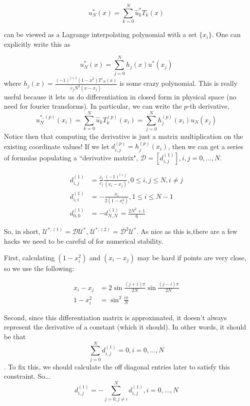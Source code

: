\documentclass[12pt]{article}
\begin{document}
\begin{equation}
    u^*_{N}(x) = \sum_{k=0}^{N} \hat{u}^*_k T_k(x)
\end{equation}

can be viewed as a Lagrange interpolating polynomial with a set $\{x_i\}$. One can explicitly write this as

\begin{equation}
    u^*_{N}(x) = \sum_{j=0}^{N} h_j(x)u^*(x_j)
\end{equation}
where $h_j(x) = \frac{(-1)^{j+1}(1-x^2)T'_N(x)}{\bar{c}_j N^2 (x - x_j)}$ is some crazy polynomial. This is really useful because it lets us do differentiation in closed form in physical space (no need for fourier transforms). In particular, we can write the $p$-th derivative,
\begin{equation}
    u^{*, (p)}_{N}(x_i) = \sum_{k=0}^N \hat{u}_k T^{(p)}_k (x_i) = \sum_{j=0}^N h^{(p)}_j(x_i)u_N(x_j)
\end{equation}
Notice then that computing the derivative is just a matrix multiplication on the existing coordinate values! If we let $d_{i,j}^{(p)} = h_j^{(p)}(x_i)$, then we can get a series of formulas populating a ``derivative matrix", $\mathcal{D} = [d^{(1)}_{i,j}], i, j = 0 , ...,N$.

\begin{align*}
    d_{i,j}^{(1)} &= \frac{\bar{c}_i}{\bar{c}_j}\frac{(-1)^{i+j}}{(x_i - x_j)}, 0 \leq i,j \leq N , i \neq j\\
    d_{i,i}^{(1)} &= -\frac{x_i}{2(1-x_i^2)}, 1\leq i \leq N - 1\\
    d_{0,0}^{(1)} &= -d_{N, N}^{(1)} = \frac{2N^2 + 1}{6}
\end{align*}

So, in short, $\mathcal{U}^{*, (1)} = \mathcal{D}\mathcal{U}^{*}$,  $\mathcal{U}^{*, (2)} = \mathcal{D}^2\mathcal{U}^{*}$. As nice as this is,there are a few hacks we need to be careful of for numerical stability.

First, calculating $(1-x_i^2)$ and $(x_i - x_j)$ may be hard if points are very close, so we use the following:

\begin{align*}
    x_i - x_j &= 2\sin \frac{(j+i)\pi}{2N}\sin \frac{(j-i)\pi}{2N} \\
    1 - x_i^2 &= \sin^2 \frac{i \pi}{N}
\end{align*}

Second, since this differentiation matrix is approximated, it doesn't always represent the derivative of a constant (which it should). In other words, it should be that
\begin{equation}
    \sum_{j=0}^N d_{i,j}^{(1)} = 0, i = 0, ..., N
\end{equation}
. To fix this, we should calculate the off diagonal entries later to satisfy this constraint. So...
\begin{equation}
    d_{i,j}^{(1)} = -\sum_{j=0, j\neq i}^N d_{i,j}^{(1)}, i = 0, ..., N
\end{equation}
\end{document}
